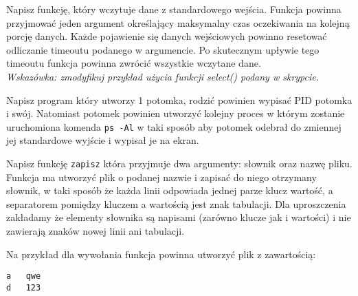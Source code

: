 % 
% 
% 
% 



\dbEntryCheckResults
Napisz funkcję, który wczytuje dane z standardowego wejścia. Funkcja powinna przyjmować jeden argument określający maksymalny czas oczekiwania na kolejną porcję danych.
Każde pojawienie się danych wejściowych powinno resetować odliczanie timeoutu podanego w argumencie. Po skutecznym upływie tego timeoutu funkcja powinna zwrócić wszystkie wczytane dane.
\\\textit{Wskazówka: zmodyfikuj przykład użycia funkcji select() podany w skrypcie.}
\fi

\dbEntryCheckResults
Napisz program który utworzy 1 potomka, rodzić powinien wypisać PID potomka i swój. Natomiast potomek powinien utworzyć kolejny proces w którym zostanie uruchomiona komenda \Verb#ps -Al# w taki sposób aby potomek odebrał do zmiennej jej standardowe wyjście i wypisał je na ekran.
\fi

\dbEntryCheckResults
Napisz funkcję \Verb#zapisz# która przyjmuje dwa argumenty: słownik oraz nazwę pliku. Funkcja ma utworzyć plik o podanej nazwie i zapisać do niego otrzymany słownik, w taki sposób że każda linii odpowiada jednej parze klucz wartość, a separatorem pomiędzy kluczem a wartością jest znak tabulacji. Dla uproszczenia zakładamy że elementy słownika są napisami (zarówno klucze jak i wartości) i nie zawierają znaków nowej linii ani tabulacji.

Na przykład dla wywołania  funkcja powinna utworzyć plik z zawartością:
\vspace{-8pt}\begin{Verbatim}
a	qwe
d	123
\end{Verbatim}
\fi
